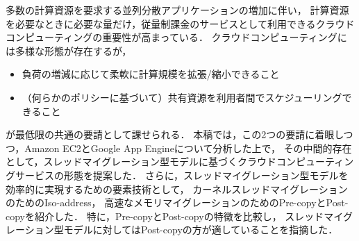 \documentclass[10pt]{jsarticle}
\begin{document}
多数の計算資源を要求する並列分散アプリケーションの増加に伴い，
計算資源を必要なときに必要な量だけ，従量制課金のサービスとして利用できるクラウドコンピューティングの重要性が高まっている．
クラウドコンピューティングには多様な形態が存在するが，
\begin{itemize}
\item 負荷の増減に応じて柔軟に計算規模を拡張/縮小できること
\item （何らかのポリシーに基づいて）共有資源を利用者間でスケジューリングできること
\end{itemize}
が最低限の共通の要請として課せられる．
本稿では，この2つの要請に着眼しつつ，Amazon EC2とGoogle App Engineについて分析した上で，
その中間的存在として，スレッドマイグレーション型モデルに基づくクラウドコンピューティングサービスの形態を提案した．
さらに，スレッドマイグレーション型モデルを効率的に実現するための要素技術として，
カーネルスレッドマイグレーションのためのIso-address，
高速なメモリマイグレーションのためのPre-copyとPost-copyを紹介した．
特に，Pre-copyとPost-copyの特徴を比較し，
スレッドマイグレーション型モデルに対してはPost-copyの方が適していることを指摘した．

%
%
\end{document}
